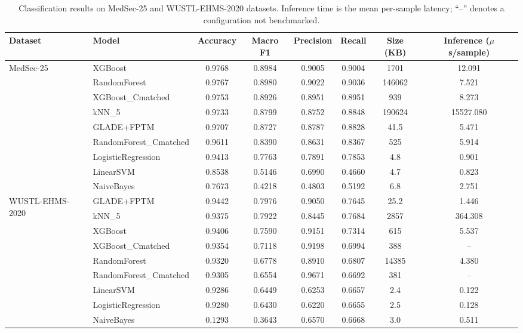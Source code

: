 \documentclass[journal,twoside,web]{ieeecolor}
\begin{document}
\begin{table}[t]
\centering
\caption{Classification results on MedSec-25 and WUSTL-EHMS-2020 datasets.
Inference time is the mean per-sample latency; ``--'' denotes a
configuration not benchmarked.}
\label{tab:results_part2}
\begin{tabular}{llcccccc}
\hline
\textbf{Dataset} & \textbf{Model} & \textbf{Accuracy} & \textbf{Macro F1} & \textbf{Precision} & \textbf{Recall} & \textbf{Size (KB)} & \textbf{Inference ($\mu$s/sample)} \\
\hline

\multirow{9}{*}{MedSec-25}
 & XGBoost                & 0.9768 & 0.8984 & 0.9005 & 0.9004 & 1701 & 12.091 \\
 & RandomForest           & 0.9767 & 0.8980 & 0.9022 & 0.9036 & 146062 & 7.521 \\
 & XGBoost\_Cmatched      & 0.9753 & 0.8926 & 0.8951 & 0.8951 & 939  & 8.273 \\
 & kNN\_5                 & 0.9733 & 0.8799 & 0.8752 & 0.8848 & 190624 & 15527.080 \\
 & GLADE+FPTM             & 0.9707 & 0.8727 & 0.8787 & 0.8828 & 41.5 & 5.471 \\
 & RandomForest\_Cmatched & 0.9611 & 0.8390 & 0.8631 & 0.8367 & 525  & 5.914 \\
 & LogisticRegression     & 0.9413 & 0.7763 & 0.7891 & 0.7853 & 4.8  & 0.901 \\
 & LinearSVM              & 0.8538 & 0.5146 & 0.6990 & 0.4660 & 4.7  & 0.823 \\
 & NaiveBayes             & 0.7673 & 0.4218 & 0.4803 & 0.5192 & 6.8  & 2.751 \\
\hline

\multirow{9}{*}{WUSTL-EHMS-2020}
 & GLADE+FPTM             & 0.9442 & 0.7976 & 0.9050 & 0.7645 & 25.2 & 1.446 \\
 & kNN\_5                 & 0.9375 & 0.7922 & 0.8445 & 0.7684 & 2857 & 364.308 \\
 & XGBoost                & 0.9406 & 0.7590 & 0.9151 & 0.7314 & 615  & 5.537 \\
 & XGBoost\_Cmatched      & 0.9354 & 0.7118 & 0.9198 & 0.6994 & 388  & -- \\
 & RandomForest           & 0.9320 & 0.6778 & 0.8910 & 0.6807 & 14385 & 4.380 \\
 & RandomForest\_Cmatched & 0.9305 & 0.6554 & 0.9671 & 0.6692 & 381  & -- \\
 & LinearSVM              & 0.9286 & 0.6449 & 0.6253 & 0.6657 & 2.4  & 0.122 \\
 & LogisticRegression     & 0.9280 & 0.6430 & 0.6220 & 0.6655 & 2.5  & 0.128 \\
 & NaiveBayes             & 0.1293 & 0.3643 & 0.6570 & 0.6668 & 3.0  & 0.511 \\
\hline
\end{tabular}
\end{table}
\end{document}
